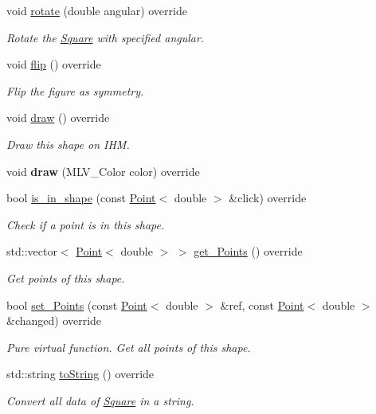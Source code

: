 \begin{DoxyCompactItemize}
void \hyperlink{classSquare_a5714e182c30f996b78e74e1badd054a2}{rotate} (double angular) override
\begin{DoxyCompactList}\small\item\em Rotate the \hyperlink{classSquare}{Square} with specified angular. \end{DoxyCompactList}\item 
\mbox{\label{classSquare_a2d56ff842244af8f2fdc85b7e5ce76f3}} 
void \hyperlink{classSquare_a2d56ff842244af8f2fdc85b7e5ce76f3}{flip} () override
\begin{DoxyCompactList}\small\item\em Flip the figure as symmetry. \end{DoxyCompactList}\item 
\mbox{\label{classSquare_a4edbdf9ae0519cc1823f4dbbaa6bbf4c}} 
void \hyperlink{classSquare_a4edbdf9ae0519cc1823f4dbbaa6bbf4c}{draw} () override
\begin{DoxyCompactList}\small\item\em Draw this shape on I\+HM. \end{DoxyCompactList}\item 
\mbox{\label{classSquare_ad1764054d43f5c91530e5067c3db42e0}} 
void {\bfseries draw} (M\+L\+V\+\_\+\+Color color) override
\item 
bool \hyperlink{classSquare_ada046df2d9fb92286d106d4b3475980a}{is\+\_\+in\+\_\+shape} (const \hyperlink{classPoint}{Point}$<$ double $>$ \&click) override
\begin{DoxyCompactList}\small\item\em Check if a point is in this shape. \end{DoxyCompactList}\item 
std\+::vector$<$ \hyperlink{classPoint}{Point}$<$ double $>$ $>$ \hyperlink{classSquare_a2a8fb1bfd2f3464cee813ec8b277506e}{get\+\_\+\+Points} () override
\begin{DoxyCompactList}\small\item\em Get points of this shape. \end{DoxyCompactList}\item 
bool \hyperlink{classSquare_ac474644483fa85f7a4f39969f34868fe}{set\+\_\+\+Points} (const \hyperlink{classPoint}{Point}$<$ double $>$ \&ref, const \hyperlink{classPoint}{Point}$<$ double $>$ \&changed) override
\begin{DoxyCompactList}\small\item\em Pure virtual function. Get all points of this shape. \end{DoxyCompactList}\item 
std\+::string \hyperlink{classSquare_aa5d7db8004bba3c400f57513d93b21d4}{to\+String} () override
\begin{DoxyCompactList}\small\item\em Convert all data of \hyperlink{classSquare}{Square} in a string. \end{DoxyCompactList}\end{DoxyCompactItemize}
